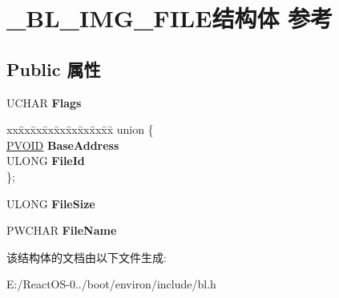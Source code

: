 \hypertarget{struct___b_l___i_m_g___f_i_l_e}{}\section{\+\_\+\+B\+L\+\_\+\+I\+M\+G\+\_\+\+F\+I\+L\+E结构体 参考}
\label{struct___b_l___i_m_g___f_i_l_e}
\subsection*{Public 属性}
\begin{DoxyCompactItemize}
\item 
\mbox{\label{struct___b_l___i_m_g___f_i_l_e_abdfbd44541310ec47ec58e1450562419}} 
U\+C\+H\+AR {\bfseries Flags}
\item 
\mbox{\label{struct___b_l___i_m_g___f_i_l_e_a27d0c92530b57614ddeff49364566073}} 
\begin{tabbing}
xx\=xx\=xx\=xx\=xx\=xx\=xx\=xx\=xx\=\kill
union \{\\
\>\hyperlink{interfacevoid}{PVOID} {\bfseries BaseAddress}\\
\>ULONG {\bfseries FileId}\\
\}; \\

\end{tabbing}\item 
\mbox{\label{struct___b_l___i_m_g___f_i_l_e_aa57ec5e4bc90cde1510913aa1d9c2a4a}} 
U\+L\+O\+NG {\bfseries File\+Size}
\item 
\mbox{\label{struct___b_l___i_m_g___f_i_l_e_ac6ae9382375d2de8260b0a9b6fc5fade}} 
P\+W\+C\+H\+AR {\bfseries File\+Name}
\end{DoxyCompactItemize}


该结构体的文档由以下文件生成\+:\begin{DoxyCompactItemize}
\item 
E\+:/\+React\+O\+S-\/0../boot/environ/include/bl.\+h\end{DoxyCompactItemize}
